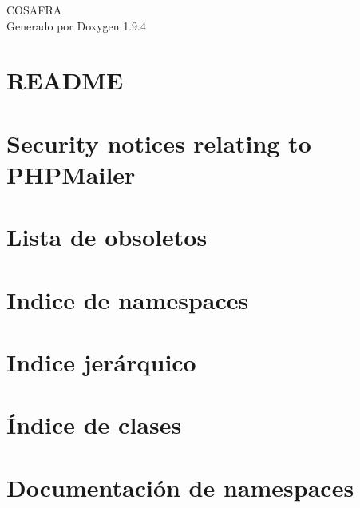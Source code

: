 \documentclass[twoside]{book}
\newcommand{\+}{\discretionary{\mbox{\scriptsize$\hookleftarrow$}}{}{}}
\newcommand{\clearemptydoublepage}{%
    \newpage{\pagestyle{empty}\cleardoublepage}%
  }
\begin{document}
  \raggedbottom
    \hypersetup{pageanchor=false,
                bookmarksnumbered=true,
                pdfencoding=unicode
               }
  \begin{titlepage}
  \vspace*{7cm}
  \begin{center}%
  {\Large COSAFRA}\\
  \vspace*{1cm}
  {\large Generado por Doxygen 1.9.4}\\
  \end{center}
  \end{titlepage}
  \clearemptydoublepage
  \tableofcontents
  \clearemptydoublepage
  \hypersetup{pageanchor=true}
\chapter{README}
\label{md_vendor_phpmailer_phpmailer__r_e_a_d_m_e}

\chapter{Security notices relating to PHPMailer}
\label{md_vendor_phpmailer_phpmailer__s_e_c_u_r_i_t_y}

\chapter{Lista de obsoletos}
\label{deprecated}

\chapter{Indice de namespaces}

\chapter{Indice jerárquico}

\chapter{Índice de clases}

\chapter{Documentación de namespaces}


\end{document}
